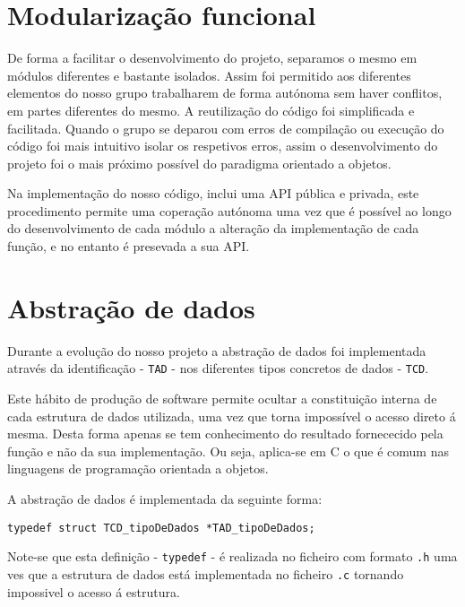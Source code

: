 \documentclass[4apaper]{report}
\begin{document}
\newpage
\section{Modularização funcional}

\label{sec:modularizacaoFuncional}

De forma a facilitar o desenvolvimento do projeto, separamos o mesmo em módulos diferentes e bastante isolados. Assim foi permitido aos diferentes elementos do nosso grupo trabalharem de forma autónoma sem haver conflitos, em partes diferentes do mesmo. A reutilização do código foi simplificada e facilitada. Quando o grupo se deparou com erros de compilação ou execução do código foi mais intuitivo isolar os respetivos erros, assim o desenvolvimento do projeto foi o mais próximo possível do paradigma orientado a objetos.\newline

Na implementação do nosso código, inclui uma API pública e privada, este procedimento permite uma coperação autónoma uma vez que é possível ao longo do desenvolvimento de cada módulo a alteração da implementação de cada função, e no entanto é presevada a sua API.

\newpage
\section{Abstração de dados}

\label{sec:abstracaoDeDados}

Durante a evolução do nosso projeto a abstração de dados foi implementada através da identificação - \texttt{TAD} - nos diferentes tipos concretos de dados - \texttt{TCD}.\newline

Este hábito de produção de software permite ocultar a constituição interna de cada estrutura de dados utilizada, uma vez que torna impossível o acesso direto á mesma. Desta forma apenas se tem conhecimento do resultado fornececido pela função e não da sua implementação. Ou seja, aplica-se em C o que é comum nas linguagens de programação orientada a objetos.\newline

A abstração de dados é implementada da seguinte forma:

\begin{verbatim}
typedef struct TCD_tipoDeDados *TAD_tipoDeDados;  
\end{verbatim}

Note-se que esta definição - \texttt{typedef} - é realizada no ficheiro com formato \texttt{.h} uma ves que a estrutura de dados está implementada no ficheiro \texttt{.c} tornando impossivel o acesso á estrutura.
\end{document}
